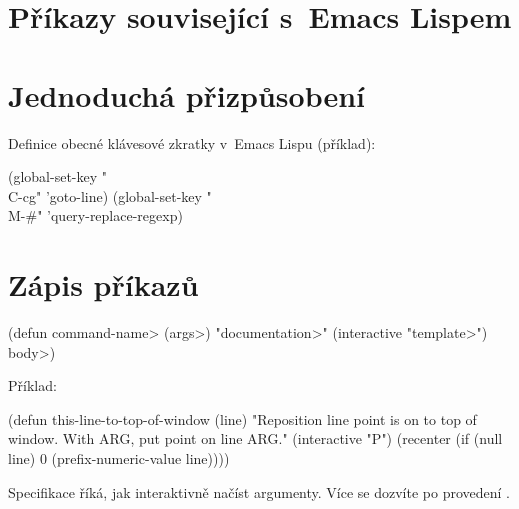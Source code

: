 \section{Příkazy související s~Emacs Lispem}


\section{Jednoduchá přizpůsobení}



Definice obecné klávesové zkratky v~Emacs Lispu (příklad):

\beginexample%
(global-set-key "\\C-cg" 'goto-line)
(global-set-key "\\M-\#" 'query-replace-regexp)
\endexample

\section{Zápis příkazů}

\beginexample%
(defun \<command-name> (\<args>)
  "\<documentation>" (interactive "\<template>")
  \<body>)
\endexample

Příklad:

\beginexample%
(defun this-line-to-top-of-window (line)
  "Reposition line point is on to top of window.
With ARG, put point on line ARG."
  (interactive "P")
  (recenter (if (null line)
                0
              (prefix-numeric-value line))))
\endexample

Specifikace  říká, jak interaktivně načíst ar\-gu\-men\-ty.
Více se dozvíte po provedení .

\copyrightnotice

\bye

